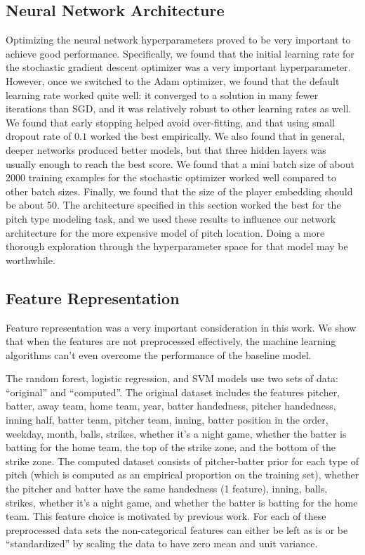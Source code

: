 \documentclass{article}
\begin{document}
\subsection{Neural Network Architecture}

Optimizing the neural network hyperparameters proved to be very important to achieve good performance.  Specifically, we found that the initial learning rate for the stochastic gradient descent optimizer was a very important hyperparameter. However, once we switched to the Adam optimizer, we found that the default learning rate worked quite well: it converged to a solution in many fewer iterations than SGD, and it was relatively robust to other learning rates as well.  We found that early stopping helped avoid over-fitting, and that using small dropout rate of $ 0.1 $ worked the best empirically.  We also found that in general, deeper networks produced better models, but that three hidden layers was usually enough to reach the best score.  We found that a mini batch size of about 2000 training examples for the stochastic optimizer worked well compared to other batch sizes.  Finally, we found that the size of the player embedding should be about 50.  The architecture specified in this section worked the best for the pitch type modeling task, and we used these results to influence our network architecture for the more expensive model of pitch location. Doing a more thorough exploration through the hyperparameter space for that model may be worthwhile.

\subsection{Feature Representation}

Feature representation was a very important consideration in this work.  We show that when the features are not preprocessed effectively, the machine learning algorithms can't even overcome the performance of the baseline model.  

The random forest, logistic regression, and SVM models use two sets of data: ``original'' and ``computed''. The original dataset includes the features pitcher, batter, away team, home team, year, batter handedness, pitcher handedness, inning half, batter team, pitcher team, inning, batter position in the order, weekday, month, balls, strikes, whether it's a night game, whether the batter is batting for the home team, the top of the strike zone, and the bottom of the strike zone. The computed dataset consists of pitcher-batter prior for each type of pitch (which is computed as an empirical proportion on the training set), whether the pitcher and batter have the same handedness (1 feature), inning, balls, strikes, whether it's a night game, and whether the batter is batting for the home team. This feature choice is motivated by previous work\cite{ganeshapillai2012predicting}. For each of these preprocessed data sets the non-categorical features can either be left as is or be ``standardized'' by scaling the data to have zero mean and unit variance.
\end{document}
